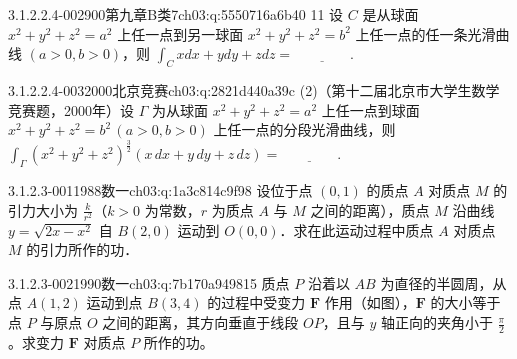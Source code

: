 \begin{q}{3.1.2.2.4-002}{900第九章B类7}{ch03:q:5550716a6b40}
11 设 $C$ 是从球面 $x^2+y^2+z^2=a^2$ 上任一点到另一球面 $x^2+y^2+z^2=b^2$ 上任一点的任一条光滑曲线 $(a>0,b>0)$，则 $\displaystyle \int_C xdx+ydy+zdz=\underline{\hspace{4em}}$.
\end{q}

\begin{q}{3.1.2.2.4-003}{2000北京竞赛}{ch03:q:2821d440a39c}
(2)（第十二届北京市大学生数学竞赛题，2000年）设 $\Gamma$ 为从球面 $x^2+y^2+z^2=a^2$ 上任一点到球面 $x^2+y^2+z^2=b^2\,(a>0,b>0)$ 上任一点的分段光滑曲线，则 $\displaystyle \int_{\Gamma}\left(x^2+y^2+z^2\right)^{\frac{3}{2}}\left(x\,dx+y\,dy+z\,dz\right)=\underline{\hspace{4em}}.$
\end{q}

\par\addvspace{2.4ex}\noindent
\begin{minipage}{\linewidth}

\begin{q}{3.1.2.3-001}{1988数一}{ch03:q:1a3c814c9f98}
设位于点 $(0,1)$ 的质点 $A$ 对质点 $M$ 的引力大小为 $\frac{k}{r^2}$（$k>0$ 为常数，$r$ 为质点 $A$ 与 $M$ 之间的距离），质点 $M$ 沿曲线 $y=\sqrt{2x-x^2}$ 自 $B(2,0)$ 运动到 $O(0,0)$．求在此运动过程中质点 $A$ 对质点 $M$ 的引力所作的功．
\end{q}
\end{minipage}


\par\addvspace{\qsep}\noindent
\begin{minipage}{\linewidth}
\begin{q}{3.1.2.3-002}{1990数一}{ch03:q:7b170a949815}
质点 $P$ 沿着以 $AB$ 为直径的半圆周，从点 $A(1,2)$ 运动到点 $B(3,4)$ 的过程中受变力 $\mathbf{F}$ 作用（如图），$\mathbf{F}$ 的大小等于点 $P$ 与原点 $O$ 之间的距离，其方向垂直于线段 $OP$，且与 $y$ 轴正向的夹角小于 $\frac{\pi}{2}$。求变力 $\mathbf{F}$ 对质点 $P$ 所作的功。
\begin{figblock}
\end{figblock}
\end{q}
\end{minipage}


